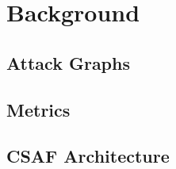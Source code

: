 \section{Background}\label{subsec:background:main}


% 

% 

\subsection{Attack Graphs}\label{subsec:background:ag}


% 

\subsection{Metrics}\label{subsec:background:metrics}


\subsection{CSAF Architecture}\label{subsec:background:arch}

